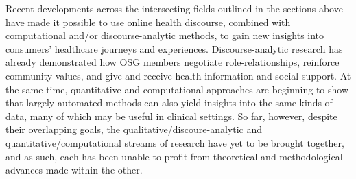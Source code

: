 


Recent developments across the intersecting fields outlined in the sections above have made it possible to use online health discourse, combined with computational and\slash or discourse\hyp{}analytic methods, to gain new insights into consumers' healthcare journeys and experiences. Discourse-analytic research has already demonstrated how \gls{OSG} \glspl{member} negotiate role\hyp{}relationships, reinforce community values, and give and receive health information and social support. At the same time, quantitative and computational approaches are beginning to show that largely automated methods can also yield insights into the same kinds of data, many of which may be useful in clinical settings. So far, however, despite their overlapping goals, the qualitative\slash discoure\hyp{}analytic and quantitative\slash computational streams of research have yet to be brought together, and as such, each has been unable to profit from theoretical and methodological advances made within the other.

